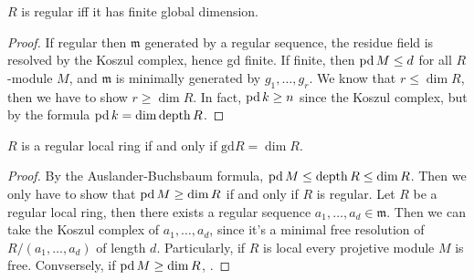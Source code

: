 \begin{theorem}
	$R$ is regular iff it has finite global dimension.
	\label{Auslander-Buchsbaum-Serre Theorem}
\end{theorem}
\begin{proof}
	If regular then $\mathfrak{m}$ generated by a regular sequence, the residue field is resolved by the Koszul complex, hence gd finite.
	If finite, then $\operatorname{pd} M \leq d$ for all $R$-module $M$, and $\mathfrak{m}$ is minimally generated by $g_1, \dots, g_r$.
	We know that $r \leq \dim R$, then we have to show $r \geq \dim R$.
	In fact, $\operatorname{pd} k \geq n$ since the Koszul complex, but by the formula $\operatorname{pd} k = \dim \operatorname{depth} R$.
\end{proof}

\begin{proposition}
	$R$ is a regular local ring if and only if $\text{gd}R = \dim R$.
\end{proposition}
\begin{proof}
	By the Auslander-Buchsbaum formula, $\operatorname{pd} M \leq \operatorname{depth} R \leq \dim R$.
	Then we only have to show that $\operatorname{pd} M \geq \dim R$ if and only if $R$ is regular.
	Let $R$ be a regular local ring, then there exists a regular sequence $a_1, \dots, a_d \in \mathfrak{m}$.
	Then we can take the Koszul complex of $a_1, \dots, a_d$, since it's a minimal free resolution of $R/(a_1, \dots, a_d)$ of length $d$.
	Particularly, if $R$ is local every projetive module $M$ is free.
	Convsersely, if $\operatorname{pd} M \geq \dim R$, .
\end{proof}
